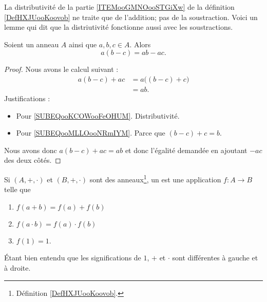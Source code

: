 \begin{normaltext}	\label{NORooDistributiviteSoustraction}
	La distributivité de la partie \ref{ITEMooGMNOooSTGiXw} de la définition \ref{DefHXJUooKoovob} ne traite que de l'addition; pas de la soustraction. Voici un lemme qui dit que la distriutivité fonctionne aussi avec les soustractions.
\end{normaltext}

\begin{lemma}     \label{LEMooVPYUooRzexke}
	Soient un anneau \( A\) ainsi que \( a,b,c\in A\). Alors
	\begin{equation}
		a(b-c)=ab-ac.
	\end{equation}
\end{lemma}

\begin{proof}
	Nous avons le calcul suivant :
	\begin{subequations}
		\begin{align}
			a(b-c)+ac & =a\big( (b-c)+c \big)     \label{SUBEQooKCOWooFeOHUM} \\
			          & =ab.       \label{SUBEQooMLLOooNRmIYM}
		\end{align}
	\end{subequations}
	Justifications :
	\begin{itemize}
		\item Pour \ref{SUBEQooKCOWooFeOHUM}. Distributivité.
		\item Pour \ref{SUBEQooMLLOooNRmIYM}. Parce que \( (b-c)+c=b\).
	\end{itemize}
	Nous avons donc \( a(b-c)+ac=ab\) et donc l'égalité demandée en ajoutant \( -ac\) des deux côtés.
\end{proof}


\begin{definition}      \label{DEFooSPHPooCwjzuz}
	Si \( (A,+,\cdot)\) et \( (B,+,\cdot)\) sont des anneaux\footnote{Définition \ref{DefHXJUooKoovob}.}, un  est une application \( f\colon A\to B\) telle que
	\begin{enumerate}
		\item \( f(a+b)=f(a)+f(b)\)
		\item \( f(a\cdot b)=f(a)\cdot f(b)\)
		\item \( f(1)=1\).
	\end{enumerate}
	Étant bien entendu que les significations de \( 1\), \( +\) et \( \cdot\) sont différentes à gauche et à droite.
\end{definition}



